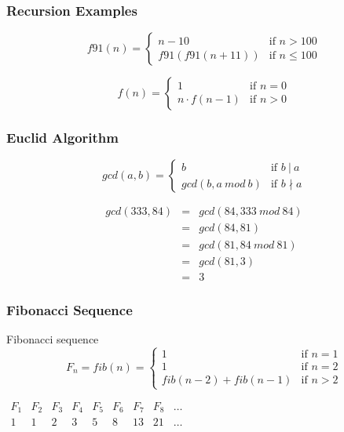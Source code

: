 \documentclass[dvipsnames]{beamer}
\begin{document}
\begin{frame}
  \frametitle{Recursion Examples}

  \begin{example}
    \[
      f91(n) =
        \begin{cases}
          n - 10         & \mbox{if } n > 100\\
          f91(f91(n+11)) & \mbox{if } n \leq 100
        \end{cases}
    \]
  \end{example}

  \pause
  \medskip
  \begin{example}[factorial]
    \[
    f(n) =
      \begin{cases}
        1              & \mbox{if } n = 0\\
        n \cdot f(n-1) & \mbox{if } n > 0
      \end{cases}
    \]
  \end{example}
\end{frame}

\begin{frame}
  \frametitle{Euclid Algorithm}

  \begin{example}
    \[
    gcd(a,b) =
      \begin{cases}
        b              & \mbox{if } b~|~a\\
        gcd(b,a~mod~b) & \mbox{if } b \nmid a
      \end{cases}
    \]

    \pause
    \medskip
    \begin{eqnarray*}
      gcd(333,84) & = & gcd(84, 333~mod~84)\\
                  & = & gcd(84, 81)\\
                  & = & gcd(81, 84~mod~81)\\
                  & = & gcd(81, 3)\\
                  & = & 3
    \end{eqnarray*}
  \end{example}
\end{frame}

\begin{frame}
  \frametitle{Fibonacci Sequence}

  \begin{block}{Fibonacci sequence}
    \[
    F_n = fib(n) =
      \begin{cases}
        1                   & \mbox{if } n = 1\\
        1                   & \mbox{if } n = 2\\
        fib(n-2) + fib(n-1) & \mbox{if } n > 2
      \end{cases}
    \]
  \end{block}

  \bigskip
  $\begin{array}{ccccccccc}
     F_1 & F_2 & F_3 & F_4 & F_5 & F_6 & F_7 & F_8 & \dots\\
     1   & 1   & 2   & 3   & 5   & 8   & 13  & 21  & \dots
  \end{array}$
\end{frame}
\end{document}
